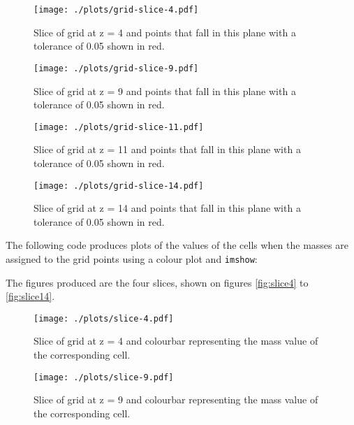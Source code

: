 \documentclass{article}
\begin{document}


\begin{figure}[!h]
\centering
\begin{minipage}[t]{7.8cm}
    \centering
    \texttt{[image: ./plots/grid-slice-4.pdf]}
    \caption{Slice of grid at z = 4 and points that fall in this plane with a tolerance of 0.05 shown in red.}
    \label{fig:s4}
\end{minipage}
\qquad
\begin{minipage}[t]{7.8cm}
    \centering
    \texttt{[image: ./plots/grid-slice-9.pdf]}
    \caption{Slice of grid at z = 9 and points that fall in this plane with a tolerance of 0.05 shown in red.}
    \label{fig:s9}
\end{minipage}
\end{figure}

\begin{figure}[!h]
\centering
\begin{minipage}[t]{7.8cm}
    \centering
    \texttt{[image: ./plots/grid-slice-11.pdf]}
    \caption{Slice of grid at z = 11 and points that fall in this plane with a tolerance of 0.05 shown in red.}
    \label{fig:s11}
\end{minipage}
\qquad
\begin{minipage}[t]{7.8cm}
    \centering
    \texttt{[image: ./plots/grid-slice-14.pdf]}
    \caption{Slice of grid at z = 14 and points that fall in this plane with a tolerance of 0.05 shown in red.}
    \label{fig:s14}
\end{minipage}
\end{figure}

The following code produces plots of the values of the cells when the masses are assigned to the grid points using a colour plot and \verb+imshow+:


The figures produced are the four slices, shown on figures \ref{fig:slice4} to \ref{fig:slice14}.

\begin{figure}[!h]
\centering
\begin{minipage}[t]{7.8cm}
    \centering
    \texttt{[image: ./plots/slice-4.pdf]}
    \caption{Slice of grid at z = 4 and colourbar representing the mass value of the corresponding cell.}
    \label{fig:slice4}
\end{minipage}
\qquad
\begin{minipage}[t]{7.8cm}
    \centering
    \texttt{[image: ./plots/slice-9.pdf]}
    \caption{Slice of grid at z = 9 and colourbar representing the mass value of the corresponding cell.}
    \label{fig:slice9}
\end{minipage}
\end{figure}
\end{document}
